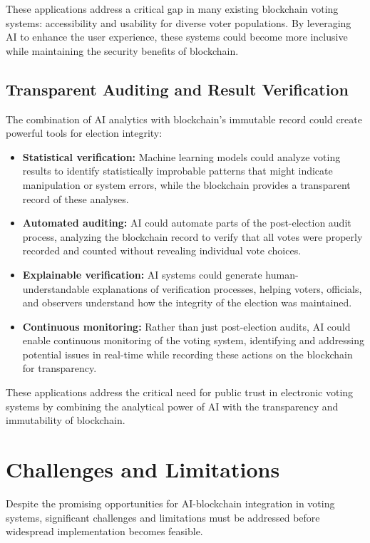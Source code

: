 \documentclass[conference]{IEEEtran}
\begin{document}
These applications address a critical gap in many existing blockchain voting systems: accessibility and usability for diverse voter populations. By leveraging AI to enhance the user experience, these systems could become more inclusive while maintaining the security benefits of blockchain.

\subsection{Transparent Auditing and Result Verification}
The combination of AI analytics with blockchain's immutable record could create powerful tools for election integrity:

\begin{itemize}
    \item \textbf{Statistical verification:} Machine learning models could analyze voting results to identify statistically improbable patterns that might indicate manipulation or system errors, while the blockchain provides a transparent record of these analyses.
    
    \item \textbf{Automated auditing:} AI could automate parts of the post-election audit process, analyzing the blockchain record to verify that all votes were properly recorded and counted without revealing individual vote choices.
    
    \item \textbf{Explainable verification:} AI systems could generate human-understandable explanations of verification processes, helping voters, officials, and observers understand how the integrity of the election was maintained.
    
    \item \textbf{Continuous monitoring:} Rather than just post-election audits, AI could enable continuous monitoring of the voting system, identifying and addressing potential issues in real-time while recording these actions on the blockchain for transparency.
\end{itemize}

These applications address the critical need for public trust in electronic voting systems by combining the analytical power of AI with the transparency and immutability of blockchain.

\section{Challenges and Limitations}
Despite the promising opportunities for AI-blockchain integration in voting systems, significant challenges and limitations must be addressed before widespread implementation becomes feasible.
\end{document}
